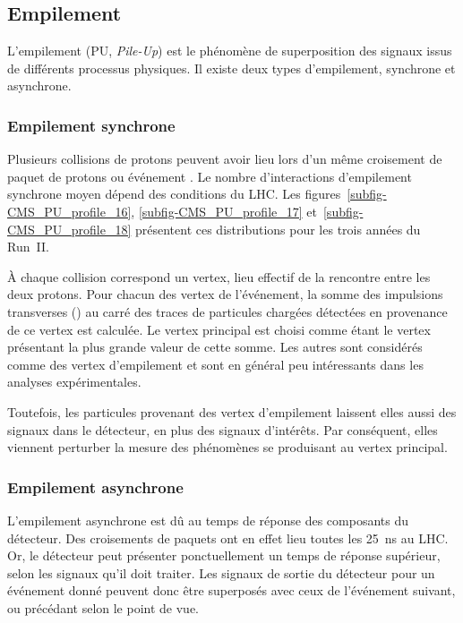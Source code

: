 \subsection{Empilement}\label{chapter-LHC-section-LHC-subsec-PU}
L'empilement (PU, \emph{Pile-Up}) est le phénomène de superposition des signaux issus de différents processus physiques.
Il existe deux types d'empilement, synchrone et asynchrone.
\subsubsection{Empilement synchrone}
Plusieurs collisions de protons peuvent avoir lieu lors d'un même  croisement de paquet de protons ou \og événement \fg.
Le nombre d'interactions d'empilement synchrone moyen dépend des conditions du LHC.
Les figures~\ref{subfig-CMS_PU_profile_16}, \ref{subfig-CMS_PU_profile_17} et~\ref{subfig-CMS_PU_profile_18} présentent ces distributions pour les trois années du Run~II.
\par À chaque collision correspond un vertex, lieu effectif de la rencontre entre les deux protons.
Pour chacun des vertex de l'événement, la somme des impulsions transverses (\pT) au carré des traces de particules chargées détectées en provenance de ce vertex est calculée.
Le vertex principal est choisi comme étant le vertex présentant la plus grande valeur de cette somme.
Les autres sont considérés comme des vertex d'empilement et sont en général peu intéressants dans les analyses expérimentales.
\par Toutefois, les particules provenant des vertex d'empilement laissent elles aussi des signaux dans le détecteur, en plus des signaux d'intérêts.
Par conséquent, elles viennent perturber la mesure des phénomènes se produisant au vertex principal.
\subsubsection{Empilement asynchrone}
L'empilement asynchrone est dû au temps de réponse des composants du détecteur.
Des croisements de paquets ont en effet lieu toutes les \SI{25}{\nano\second} au LHC.
Or, le détecteur peut présenter ponctuellement un temps de réponse supérieur, selon les signaux qu'il doit traiter.
Les signaux de sortie du détecteur pour un événement donné peuvent donc être superposés avec ceux de l'événement suivant, ou précédant selon le point de vue.
